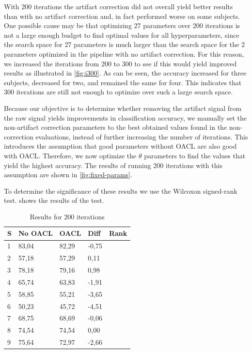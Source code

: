 With 200 iterations the artifact correction did not overall yield better results than with no artifact correction and, in fact performed worse on some subjects. One possible cause may be that optimizing 27 parameters over 200 iterations is not a large enough budget to find optimal values for all hyperparameters, since the search space for 27 parameters is much larger than the search space for the 2 parameters optimized in the pipeline with no artifact correction. For this reason, we increased the iterations from 200 to 300 to see if this would yield improved results as illustrated in \cref{fig:i300}. As can be seen, the accuracy increased for three subjects, decreased for two, and remained the same for four. This indicates that 300 iterations are still not enough to optimize over such a large search space.

Because our objective is to determine whether removing the artifact signal from the raw signal yields improvements in classification accuracy, we manually set the non-artifact correction parameters to the best obtained values found in the non-correction evaluations, instead of further increasing the number of iterations. This introduces the assumption that good parameters without OACL are also good with OACL. Therefore, we now optimize the $\theta$ parameters to find the values that yield the highest accuracy. The results of running 200 iterations with this assumption are shown in \cref{fig:fixed-params}. 

To determine the significance of these results we use the Wilcoxon signed-rank test.  shows the results of the test.

\begin{table}[H]
	\centering
	\caption{Results for 200 iterations}
	\label{fig:resultsi200}
	\begin{tabular}{@{}l|llll@{}}
		\toprule
		S & No OACL & OACL & Diff & Rank \\ \midrule
		1 &   83,04            & 82,29           & -0,75 &      \\
		2 &   57,18            & 57,29   	     & 0,11 &      \\
		3 &   78,18            & 79,16           & 0,98 &      \\
		4 &   65,74            & 63,83           & -1,91 &      \\
		5 &   58,85            & 55,21           & -3,65 &      \\
		6 &   50,23            & 45,72           & -4,51 &      \\
		7 &   68,75            & 68,69           & -0,06&      \\
		8 &   74,54            & 74,54           & 0,00 &      \\
		9 &   75,64            & 72,97           & -2,66 &      \\ \bottomrule
	\end{tabular}
\end{table}

